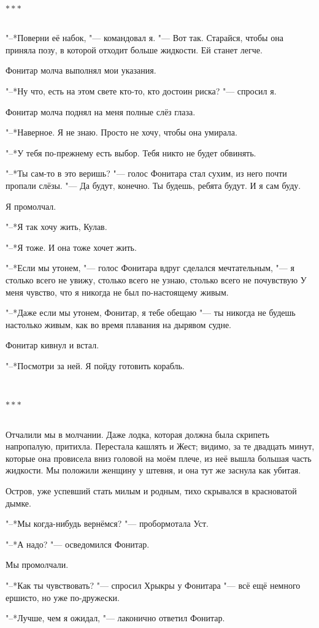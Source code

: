 \documentclass[a4paper,12pt,fleqn]{book}
\newcommand{\ldotst}{\so{...}\xspace}
\newcommand{\razd}{~\\{\centering\Large\bfseries$\ast \ast \ast$\par}~\\}
\begin{document}
\razd

"--*Поверни её набок, "--- командовал я.
"--- Вот так.
Старайся, чтобы она приняла позу, в которой отходит больше жидкости.
Ей станет легче.

Фонитар молча выполнял мои указания.

"--*Ну что, есть на этом свете кто-то, кто достоин риска? "--- спросил я.

Фонитар молча поднял на меня полные слёз глаза.

"--*Наверное.
Я не знаю.
Просто не хочу, чтобы она умирала.

"--*У тебя по-прежнему есть выбор.
Тебя никто не будет обвинять.

"--*Ты сам-то в это веришь? "--- голос Фонитара стал сухим, из него почти пропали слёзы.
"--- Да будут, конечно.
Ты будешь, ребята будут.
И я сам буду.

Я промолчал.

"--*Я так хочу жить, Кулав.

"--*Я тоже.
И она тоже хочет жить.

"--*Если мы утонем, "--- голос Фонитара вдруг сделался мечтательным, "--- я столько всего не увижу, столько всего не узнаю, столько всего не почувствую\ldotst
У меня чувство, что я никогда не был по-настоящему живым.

"--*Даже если мы утонем, Фонитар, я тебе обещаю "--- ты никогда не будешь настолько живым, как во время плавания на дырявом судне.

Фонитар кивнул и встал.

"--*Посмотри за ней.
Я пойду готовить корабль.

\razd

Отчалили мы в молчании.
Даже лодка, которая должна была скрипеть напропалую, притихла.
Перестала кашлять и Жест;
видимо, за те двадцать минут, которые она провисела вниз головой на моём плече, из неё вышла большая часть жидкости.
Мы положили женщину у штевня, и она тут же заснула как убитая.

Остров, уже успевший стать милым и родным, тихо скрывался в красноватой дымке.

"--*Мы когда-нибудь вернёмся? "--- пробормотала Уст.

"--*А надо? "--- осведомился Фонитар.

Мы промолчали.

"--*Как ты чувствовать? "--- спросил Хрыкры у Фонитара "--- всё ещё немного ершисто, но уже по-дружески.

"--*Лучше, чем я ожидал, "--- лаконично ответил Фонитар.
\end{document}
